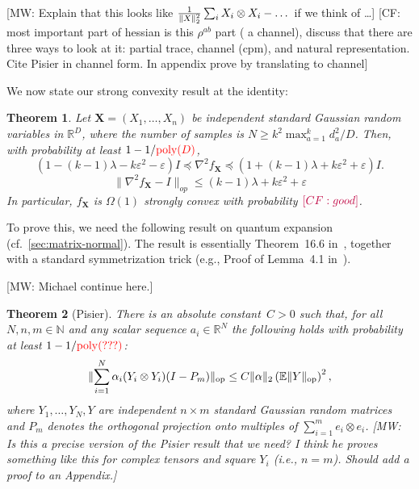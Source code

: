 \documentclass{article}
\newtheorem{theorem}{Theorem}
\DeclareMathOperator{\poly}{poly}
\DeclarePairedDelimiter{\norm}{\lVert}{\rVert}
\newcommand{\R}{{\mathbb{R}}}
\newcommand{\ot}{\otimes}
\newcommand{\op}{\operatorname{op}}
\newcommand{\N}{{\mathbb{N}}}
\renewcommand{\vec}{\bm}
\newcommand{\E}{\mathbb{E}}
\newcommand\eps{\varepsilon}
\newcommand{\CF}[1]{{\color{purple}[CF: #1]}}
\newcommand{\MW}[1]{{\color{red}[MW: #1]}}
\begin{document}
\MW{Explain that this looks like $\frac1{\norm X_2^2} \sum_i X_i \ot X_i - \dots$ if we think of \dots}
\CF{most important part of hessian is this $\rho^{ab}$ part ( a channel), discuss that there are three ways to look at it: partial trace, channel (cpm), and natural representation. Cite Pisier in channel form. In appendix prove by translating to channel}







We now state our strong convexity result at the identity:

\begin{theorem}\label{thm:tensor-convexity}
Let $\vec X = (X_1,\dots,X_n)$ be independent standard Gaussian random variables in $\R^D$, where the number of samples is $N \geq k^2 \max_{a=1}^k d_a^2 / D$. Then, with probability at least $1 - 1/{\color{red}\poly(D)}$, 
$$ (1 - (k - 1) \lambda - k \eps^2 - \eps) I \preceq 
 \nabla^2 f_{\vec X} \preceq (1 + (k - 1) \lambda + k \eps^2 + \eps) I.$$
$$ \|\nabla^{2} f_{\vec X} - I\|_{op} \leq (k - 1) \lambda + k \eps^2 + \eps $$
 In particular, $f_{\vec X}$ is $\Omega(1)$ strongly convex with probability $\CF{good}$. 
\end{theorem}

To prove this, we need the following result on quantum expansion (cf.\ \cref{sec:matrix-normal}).
The result is essentially Theorem~16.6 in~\cite{pisier2012grothendieck}, together with a standard symmetrization trick (e.g., Proof of Lemma~4.1 in~\cite{P14}).

\MW{Michael continue here.} 

\begin{theorem}[Pisier]
There is an absolute constant~$C>0$ such that, for all $N,n,m\in\N$ and any scalar sequence $a_i \in \R^N$ the following holds with probability at least $1-1/{\color{red}\poly(???)}$:
\begin{align*}
  \norm{ \sum_{i=1}^N \alpha_i (Y_i \ot Y_i) (I - P_m) }_{\op}
\leq C \norm{\alpha}_2 \left( \E \norm{Y}_{\op} \right)^2,
\end{align*}
where $Y_1,\dots,Y_N,Y$ are independent $n\times m$ standard Gaussian random matrices and $P_m$ denotes the orthogonal projection onto multiples of $\sum_{i=1}^m e_i \ot e_i$.
\MW{Is this a precise version of the Pisier result that we need? I think he proves something like this for complex tensors and square $Y_i$ (i.e., $n=m$). Should add a proof to an Appendix.}
\end{theorem}
\end{document}
